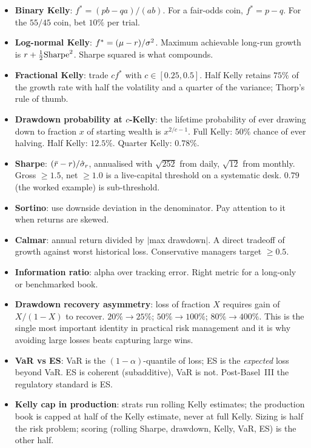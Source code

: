 \begin{itemize}
  \item \textbf{Binary Kelly}: $f^{*} = (pb - qa)/(ab)$. For a
  fair-odds coin, $f^{*} = p - q$. For the $55/45$ coin, bet
  $10\%$ per trial.
  \item \textbf{Log-normal Kelly}: $f^{*} = (\mu - r)/\sigma^2$.
  Maximum achievable long-run growth is $r + \tfrac12
  \text{Sharpe}^2$. Sharpe squared is what compounds.
  \item \textbf{Fractional Kelly}: trade $cf^{*}$ with $c \in
  [0.25, 0.5]$. Half Kelly retains $75\%$ of the growth rate
  with half the volatility and a quarter of the variance;
  Thorp's rule of thumb.
  \item \textbf{Drawdown probability at $c$-Kelly}: the lifetime
  probability of ever drawing down to fraction $x$ of starting
  wealth is $x^{2/c - 1}$. Full Kelly: $50\%$ chance of ever
  halving. Half Kelly: $12.5\%$. Quarter Kelly: $0.78\%$.
  \item \textbf{Sharpe}: $(\bar r - r)/\hat{\sigma}_r$,
  annualised with $\sqrt{252}$ from daily, $\sqrt{12}$ from
  monthly. Gross $\geq 1.5$, net $\geq 1.0$ is a live-capital
  threshold on a systematic desk. $0.79$ (the worked example) is
  sub-threshold.
  \item \textbf{Sortino}: use downside deviation in the
  denominator. Pay attention to it when returns are skewed.
  \item \textbf{Calmar}: annual return divided by $|$max
  drawdown$|$. A direct tradeoff of growth against worst
  historical loss. Conservative managers target $\geq 0.5$.
  \item \textbf{Information ratio}: alpha over tracking error.
  Right metric for a long-only or benchmarked book.
  \item \textbf{Drawdown recovery asymmetry}: loss of fraction
  $X$ requires gain of $X/(1-X)$ to recover. $20\% \to 25\%$;
  $50\% \to 100\%$; $80\% \to 400\%$. This is the single most
  important identity in practical risk management and it is why
  avoiding large losses beats capturing large wins.
  \item \textbf{VaR vs ES}: VaR is the $(1-\alpha)$-quantile of
  loss; ES is the \emph{expected} loss beyond VaR. ES is
  coherent (subadditive), VaR is not. Post-Basel~III the
  regulatory standard is ES.
  \item \textbf{Kelly cap in production}: strats run rolling
  Kelly estimates; the production book is capped at half of the
  Kelly estimate, never at full Kelly. Sizing is half the risk
  problem; scoring (rolling Sharpe, drawdown, Kelly, VaR, ES) is
  the other half.
\end{itemize}
